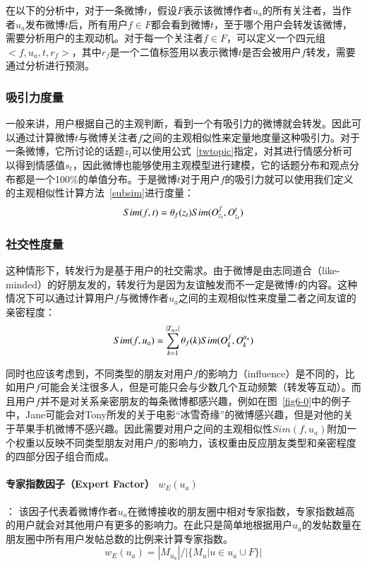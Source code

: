 在以下的分析中，对于一条微博$ t $，假设$ F $表示该微博作者$ u_{a} $的所有关注者，当作者$ u_{a} $发布微博$ t $后，所有用户$ f \in F $都会看到微博$ t $，至于哪个用户会转发该微博，需要分析用户的主观动机。对于每一个关注者$ f \in F $，可以定义一个四元组$ <f, u_{a}, t, r_{f}>  $，其中$ r_{f} $是一个二值标签用以表示微博$ t $是否会被用户$ f $转发，需要通过分析进行预测。

\subsubsection{吸引力度量}
一般来讲，用户根据自己的主观判断，看到一个有吸引力的微博就会转发。因此可以通过计算微博$ t $与微博关注者$ f $之间的主观相似性来定量地度量这种吸引力。对于一条微博，它所讨论的话题$ z_t $可以使用公式~\ref{twtopic}指定，对其进行情感分析可以得到情感值$ s_t $，因此微博也能够使用主观模型进行建模，它的话题分布和观点分布都是一个100\%的单值分布。于是微博$t$对于用户$f$的吸引力就可以使用我们定义的主观相似性计算方法~\ref{subsim}进行度量：
\begin{equation}
Sim(f,t)=\theta_{f}(z_t)\* Sim(O_{z_t}^{f},O_{z_t}^{t})
\end{equation}

\subsubsection{社交性度量}
这种情形下，转发行为是基于用户的社交需求。由于微博是由志同道合（like-minded）的好朋友发的，转发行为是因为友谊触发而不一定是微博$ t $的内容。这种情况下可以通过计算用户$ f $与微博作者$ u_a $之间的主观相似性来度量二者之间友谊的亲密程度：
\begin{equation}
Sim(f,u_a)=\sum_{k=1}^{|T_{u,v}|}\theta_{f}(k)\* Sim(O_{k}^{f},O_{k}^{u_a})
\end{equation}

同时也应该考虑到，不同类型的朋友对用户$ f $的影响力（influence）是不同的，比如用户$ f $可能会关注很多人，但是可能只会与少数几个互动频繁（转发等互动）。而且用户$ f $并不是对关系亲密朋友的每条微博都感兴趣，例如在图~\ref{fig6-0}中的例子中，Jane可能会对Tony所发的关于电影“冰雪奇缘”的微博感兴趣，但是对他的关于苹果手机微博不感兴趣。因此需要对用户之间的主观相似性$ Sim(f,u_a) $附加一个权重以反映不同类型朋友对用户$ f $的影响力，该权重由反应朋友类型和亲密程度的四部分因子组合而成。

\paragraph{专家指数因子（Expert Factor） $ w_E(u_a) $}： 
该因子代表着微博作者$ u_a $在微博接收的朋友圈中相对专家指数，专家指数越高的用户就会对其他用户有更多的影响力。在此只是简单地根据用户$ u_a $的发帖数量在朋友圈中所有用户发帖总数的比例来计算专家指数。
\begin{equation}
w_E(u_a)=|M_{u_a}|/|\{M_u|u \in u_a \cup F \}|
\end{equation}

